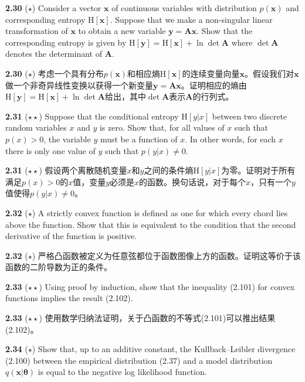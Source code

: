 \documentclass{article}
\begin{document}
\textbf{2.30} ($\star$) Consider a vector $\mathbf{x}$ of continuous variables with distribution $p(\mathbf{x})$ and corresponding entropy $\mathrm{H}[\mathbf{x}]$. Suppose that we make a non-singular linear transformation of $\mathbf{x}$ to obtain a new variable $\mathbf{y}=\mathbf{A} \mathbf{x}$. Show that the corresponding entropy is given by $\mathrm{H}[\mathbf{y}]=\mathrm{H}[\mathbf{x}]+\ln \operatorname{det} \mathbf{A}$ where $\operatorname{det} \mathbf{A}$ denotes the determinant of $\mathbf{A}$.

\textbf{2.30} ($\star$) 考虑一个具有分布$p(\mathbf{x})$和相应熵$\mathrm{H}[\mathbf{x}]$的连续变量向量$\mathbf{x}$。假设我们对$\mathbf{x}$做一个非奇异线性变换以获得一个新变量$\mathbf{y}=\mathbf{A} \mathbf{x}$。证明相应的熵由$\mathrm{H}[\mathbf{y}]=\mathrm{H}[\mathbf{x}]+\ln \operatorname{det} \mathbf{A}$给出，其中$\operatorname{det} \mathbf{A}$表示$\mathbf{A}$的行列式。

\textbf{2.31} ($\star\star$) Suppose that the conditional entropy $\mathrm{H}[y | x]$ between two discrete random variables $x$ and $y$ is zero. Show that, for all values of $x$ such that $p(x)>0$, the variable $y$ must be a function of $x$. In other words, for each $x$ there is only one value of $y$ such that $p(y | x) \neq 0$.

\textbf{2.31} ($\star\star$) 假设两个离散随机变量$x$和$y$之间的条件熵$\mathrm{H}[y | x]$为零。证明对于所有满足$p(x)>0$的$x$值，变量$y$必须是$x$的函数。换句话说，对于每个$x$，只有一个$y$值使得$p(y | x) \neq 0$。


\textbf{2.32} ($\star$) A strictly convex function is defined as one for which every chord lies above the function. Show that this is equivalent to the condition that the second derivative of the function is positive.

\textbf{2.32} ($\star$) 严格凸函数被定义为任意弦都位于函数图像上方的函数。证明这等价于该函数的二阶导数为正的条件。

\textbf{2.33} ($\star\star$) Using proof by induction, show that the inequality (2.101) for convex functions implies the result (2.102).

\textbf{2.33} ($\star\star$) 使用数学归纳法证明，关于凸函数的不等式(2.101)可以推出结果(2.102)。

\textbf{2.34} ($\star$) Show that, up to an additive constant, the Kullback–Leibler divergence (2.100) between the empirical distribution (2.37) and a model distribution $q(\mathbf{x}|\boldsymbol{\theta})$ is equal to the negative log likelihood function.
\end{document}

